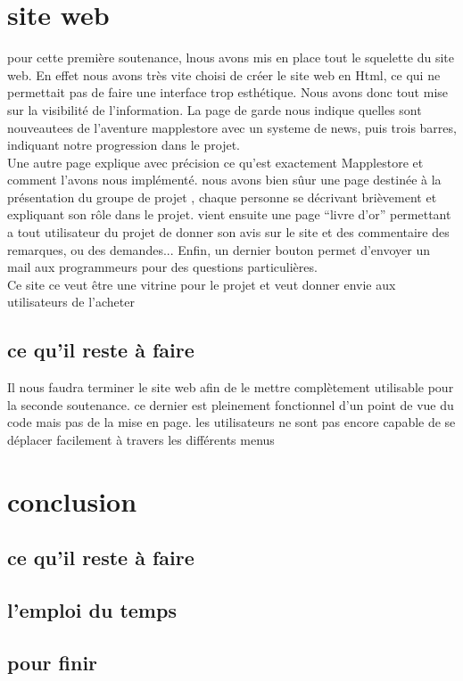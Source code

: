 \documentclass[12pt]{report}
\begin{document}
\chapter{site web}

pour cette première soutenance, lnous avons mis en place tout le squelette du site web. En effet nous avons très vite choisi de créer le site web en Html, ce qui ne permettait pas de faire une interface trop esthétique. Nous avons donc tout mise sur la visibilité de l'information. La page de garde nous indique quelles sont nouveautees de l'aventure mapplestore avec un systeme de news, puis trois barres, indiquant notre progression dans le projet. \\
Une autre page explique avec précision ce qu'est exactement Mapplestore et comment l'avons nous implémenté. nous avons bien sûur une page destinée à la présentation du groupe de projet , chaque personne se décrivant brièvement et expliquant son rôle dans le projet. vient ensuite une page ``livre d'or'' permettant a tout utilisateur du projet de donner son avis sur le site et des commentaire des remarques, ou des demandes... Enfin, un dernier bouton permet d'envoyer un mail aux programmeurs pour des questions particulières.\\
 Ce site ce veut être une vitrine pour le projet et veut donner envie aux utilisateurs de l'acheter

\section{ce qu'il reste à faire}
Il nous faudra terminer le site web afin de le mettre complètement utilisable pour la seconde soutenance. ce dernier est pleinement fonctionnel d'un point de vue du code mais pas de la mise en page. les utilisateurs ne sont pas encore capable de se déplacer facilement à travers les différents menus
\chapter{conclusion}
\section{ce qu'il reste à faire}
\section{l'emploi du temps}
\section{pour finir}


\end{document}
